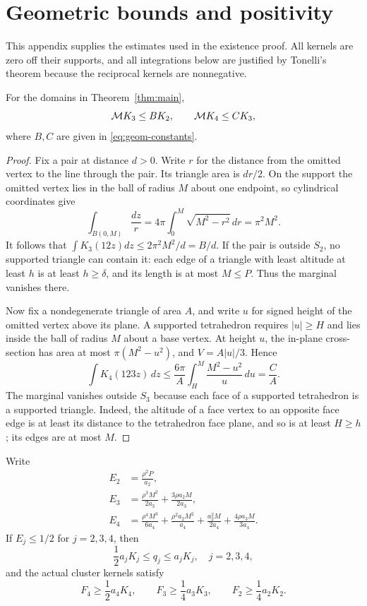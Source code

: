 \section{Geometric bounds and positivity}
\label{app:bounds}

This appendix supplies the estimates used in the existence proof. All kernels are zero off their supports, and all integrations below are justified by Tonelli's theorem because the reciprocal kernels are nonnegative.

\begin{lemma}
\label{lem:marginal-bounds}
For the domains in Theorem~\ref{thm:main},
\[
 \mathcal M K_3\leq B K_2,\qquad \mathcal M K_4\leq C K_3,
\]
where $B,C$ are given in \eqref{eq:geom-constants}.
\end{lemma}

\begin{proof}
Fix a pair at distance $d>0$. Write $r$ for the distance from the omitted vertex to the line through the pair. Its triangle area is $dr/2$. On the support the omitted vertex lies in the ball of radius $M$ about one endpoint, so cylindrical coordinates give
\[
 \int_{B(0,M)}\frac{dz}{r}
 =4\pi\int_0^M\sqrt{M^2-r^2}\,dr=\pi^2M^2.
\]
It follows that $\int K_3(12z)dz\leq 2\pi^2M^2/d=B/d$. If the pair is outside $S_2$, no supported triangle can contain it: each edge of a triangle with least altitude at least $h$ is at least $h\geq\delta$, and its length is at most $M\leq P$. Thus the marginal vanishes there.

Now fix a nondegenerate triangle of area $A$, and write $u$ for signed height of the omitted vertex above its plane. A supported tetrahedron requires $|u|\geq H$ and lies inside the ball of radius $M$ about a base vertex. At height $u$, the in-plane cross-section has area at most $\pi(M^2-u^2)$, and $V=A|u|/3$. Hence
\[
 \int K_4(123z)\,dz
 \leq\frac{6\pi}{A}\int_H^M\frac{M^2-u^2}{u}\,du
 =\frac{C}{A}.
\]
The marginal vanishes outside $S_3$ because each face of a supported tetrahedron is a supported triangle. Indeed, the altitude of a face vertex to an opposite face edge is at least its distance to the tetrahedron face plane, and so is at least $H\geq h$; its edges are at most $M$.
\end{proof}

\begin{lemma}
\label{lem:kernel-positive}
Write
\begin{align*}
 E_2&=\frac{\rho^2P}{a_2},\\
 E_3&=\frac{\rho^3M^2}{2a_3}+\frac{3\rho a_2M}{2a_3},\\
 E_4&=\frac{\rho^4M^3}{6a_4}+\frac{\rho^2a_2M^2}{a_4}
       +\frac{a_2^2M}{2a_4}+\frac{4\rho a_3M}{3a_4}.
\end{align*}
If $E_j\leq1/2$ for $j=2,3,4$, then
\[
 \frac12a_jK_j\leq q_j\leq a_jK_j,\quad j=2,3,4,
\]
and the actual cluster kernels satisfy
\[
 F_4\geq\frac12a_4K_4,\qquad F_3\geq\frac14a_3K_3,
 \qquad F_2\geq\frac14a_2K_2.
\]
\end{lemma}

